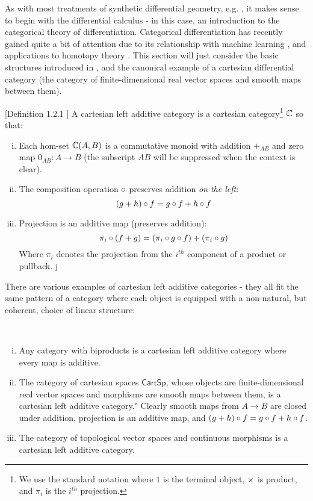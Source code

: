 As with most treatments of synthetic differential geometry, e.g. \cite{Kock2006}, it makes sense to begin with the differential calculus - in this case, an introduction to the categorical theory of differentiation. Categorical differentiation has recently gained quite a bit of attention due to its relationship with machine learning \cite{Cockett2019}, and applications to homotopy theory \cite{Bauer2016}. This section will just consider the basic structures introduced in \cite{Blute2009}, and the canonical example of a cartesian differential category (the category of finite-dimensional real vector spaces and smooth maps between them).

\begin{definition}\label{def:clac}[Definition 1.2.1 \cite{Blute2009}]
    A cartesian left additive category is a cartesian category\footnote{We use the standard notation where $1$ is the terminal object, $\times$ is product, and $\pi_i$ is the $i^{th}$ projection.} $\mathbb{C}$ so that:
    \begin{enumerate}[(i)]
        \item Each hom-set $\mathbb{C}(A,B)$ is a commutative monoid with addition $+_{AB}$ and zero map $0_{AB}:A \to B$ (the subscript $AB$ will be suppressed when the context is clear).
        \item The composition operation $\circ$ preserves addition \textit{on the left}: \[(g+h) \circ f= g \circ f + h \circ f\]
        \item Projection is an additive map (preserves addition): \[\pi_i \circ (f + g) = (\pi_i \circ g \circ f) + (\pi_i \circ g)\]
        Where $\pi_i$ denotes the projection from the $i^{th}$ component of a product or pullback.
j    \end{enumerate}
\end{definition}
There are various examples of cartesian left additive categories - they all fit the same pattern of a category where each object is equipped with a non-natural, but coherent, choice of linear structure:
\begin{example}\label{ex:clacs}
    ~\begin{enumerate}[(i)]
        \item Any category with biproducts is a cartesian left additive category where every map is additive. 
        \item The category of cartesian spaces $\mathsf{CartSp}$, whose objects are finite-dimensional real vector spaces and morphisms are smooth maps between them, is a cartesian left additive category."
        Clearly smooth maps from $A \to B$ are closed under addition, projection is an additive map, and $(g+h) \circ f= g \circ f + h \circ f$.
        \item   The category of topological vector spaces and continuous morphisms is a cartesian left additive category. 
    \end{enumerate}
\end{example}
